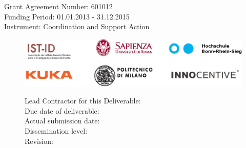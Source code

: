 \begin{center}
  {Grant Agreement Number: 601012}\\
  {Funding Period: 01.01.2013 - 31.12.2015}\\
  {Instrument: Coordination and Support Action}\\
\end{center}


\vspace*{0.5cm}
\hrulefill
\vspace{-0.1cm}

\begin{center}
{\LARGE \bfseries \documentTitle }
\end{center}

\vspace{0.3cm}

\begin{center}
{\large \documentAuthors}
\end{center}

\vspace{-0.3cm}

\hrulefill

\vspace*{0.1cm}

\begin{figure}[b]
\centering
\includegraphics[height=\institutionLogoHeight]{./fig/logos/consortiumLogo.eps}
\vspace*{0.8cm}

\begin{minipage}[b]{0.5\textwidth}
\flushleft
{\large Lead Contractor for this Deliverable: }\\
{\large Due date of deliverable: }\\
{\large Actual submission date: }\\
{\large Dissemination level: }\\
{\large Revision: }
\end{minipage}%
\begin{minipage}[b]{0.5\textwidth}
\flushleft
{\large \leadContractor }\\
{\large \dateOfDeliverable }\\
{\large \actualSubmissionDate }\\
{\large \disseminationLevel }\\
{\large \revisionNumber }
\end{minipage}

\end{figure}

\restoregeometry

\pagebreak
